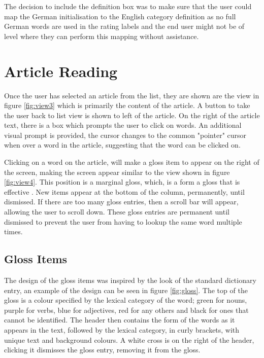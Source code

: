 The decision to include the definition box was to make sure that the user could map the German initialisation to the English category definition as no full German words are used in the rating labels and the end user might not be of level where they can perform this mapping without assistance.  

\section{Article Reading}

Once the user has selected an article from the list, they are shown are the view in figure \ref{fig:view3} which is primarily the content of the article. A button to take the user back to list view is shown to left of the article. On the right of the article text, there is a box which prompts the user to click on words. An additional visual prompt is provided, the cursor changes to the common "pointer" cursor when over a word in the article, suggesting that the word can be clicked on.




Clicking on a word on the article, will make a gloss item to appear on the right of the screen, making the screen appear similar to the view shown in figure \ref{fig:view4}. This position is a marginal gloss, which, is a form a gloss that is effective \parencite{abuseileek2008}. New items appear at the bottom of the column, permanently, until dismissed. If there are too many gloss entries, then a scroll bar will appear, allowing the user to scroll down. These gloss entries are permanent until dismissed to prevent the user from having to lookup the same word multiple times.


 

\subsection{Gloss Items}



The design of the gloss items was inspired by the look of the standard dictionary entry, an example of the design can be seen in figure \ref{fig:gloss}. The top of the gloss is a colour specified by the lexical category of the word; green for nouns, purple for verbs, blue for adjectives, red for any others and black for ones that cannot be identified. The header then contains the form of the words as it appears in the text, followed by the lexical category, in curly brackets, with unique text and background colours. A white cross is on the right of the header, clicking it dismisses the gloss entry, removing it from the gloss. 

